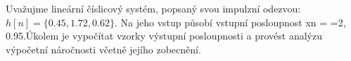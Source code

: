 \begin{mdframed}[style=mdexam]
  \begin{example}\label{tky:exam001}
    Uvažujme lineární číslicový systém, popsaný svou impulzní odezvou: \(h[n] = \{0.45, 1.72,
    0.62\}\). Na jeho vstup působí vstupní posloupnost xn = ={2,  0.95}.Úkolem  je  vypočítat
    vzorky výstupní posloupnosti a provést analýzu výpočetní náročnosti včetně jejího zobecnění.
  \end{example} 
\end{mdframed}